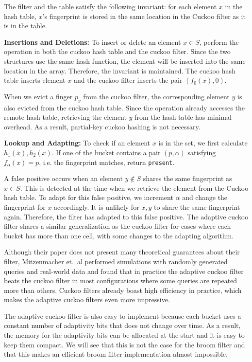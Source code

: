 \documentclass[../paper.tex]{subfiles}
\begin{document}
The filter and the table satisfy the following invariant: for each element $x$ in the hash table, $x$'s fingerprint is stored in the same location in the Cuckoo filter as it is in the table.

\textbf{Insertions and Deletions:} To insert or delete an element $x\in S$, perform the operation in both the cuckoo hash table and the cuckoo filter.
Since the two structures use the same hash function, the element will be inserted into the same location in the array. Therefore, the invariant is maintained.
The cuckoo hash table inserts element $x$ and the cuckoo filter inserts the pair $(f_0(x),0)$.

When we evict a finger $p_y$ from the cuckoo filter, the corresponding element $y$ is also evicted from the cuckoo hash table.
Since the operation already accesses the remote hash table, retrieving the element $y$ from the hash table has minimal overhead. As a result, partial-key cuckoo hashing is not necessary.

\textbf{Lookup and Adapting:} To check if an element $x$ is in the set, we first calculate $h_1(x), h_2(x)$. If one of the bucket contains a pair $(p,\alpha)$ satisfying $f_\alpha(x)=p$, i.e. the fingerprint matches, return \texttt{present}.

A false positive occurs when an element $y\not\in S$ shares the same fingerprint as $x\in S$. This is detected at the time when we retrieve the element from the
Cuckoo hash table. To adapt for this false positive, we increment $\alpha$ and change the fingerprint for $x$ accordingly. It is unlikely for $x,y$ to share the same fingerprint again.
Therefore, the filter has adapted to this false positive. The adaptive cuckoo filter shares a similar generalization as the cuckoo filter for cases where each bucket has more than one cell, with some changes to the adapting algorithm.

Although their paper does not present many theoretical guarantees about their filter, Mitzenmacher et.\ al performed simulations with randomly generated queries and real-world data and found that in practice the adaptive cuckoo filter beats the cuckoo filter in most configurations where some queries are repeated more than others. Cuckoo filters already boast high efficiency in practice, which makes the adaptive cuckoo filters even more impressive.

The adaptive cuckoo filter is also easy to implement because each bucket uses a constant number of adaptivity bits that does not change over time.
As a result, the memory for the adaptivity bits can be allocated at the start and it is easy to keep them compact. We will see that this is not the case
for the broom filter and that this makes an efficient broom filter implementation almost impossible.
\end{document}
